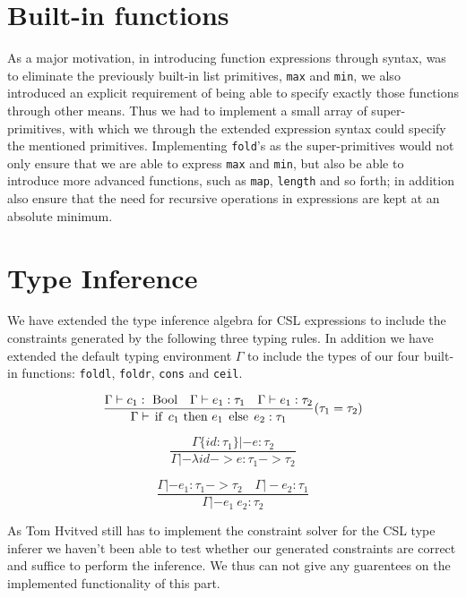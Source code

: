 \documentclass[10pt,a4paper,final,oneside,openany,article]{memoir}
\newcommand{\kw}[1]{\text{\lstinline{#1}}}
\begin{document}
\section{Built-in functions}
As a major motivation, in introducing function expressions through
syntax, was to eliminate the previously built-in list primitives,
\lstinline{max} and \lstinline{min}, we also introduced an explicit
requirement of being able to specify exactly those functions through
other means. Thus we had to implement a small array of super-primitives,
with which we through the extended expression syntax could specify the
mentioned primitives. Implementing \lstinline{fold}'s as the
super-primitives would not only ensure that we are able to express
\lstinline{max} and \lstinline{min}, but also be able to introduce more
advanced functions, such as \lstinline{map}, \lstinline{length} and so
forth; in addition also ensure that the need for recursive operations
in expressions are kept at an absolute minimum.

\section{Type Inference}
We have extended the type inference algebra for CSL expressions to
include the constraints generated by the following three typing rules.
In addition we have extended the default typing environment $\Gamma$
to include the types of our four built-in functions:
\lstinline{foldl}, \lstinline{foldr}, \lstinline{cons} and
\lstinline{ceil}.

\begin{equation*}
\frac{
  \Gamma |- c_1 : ~\kw{Bool}
  \quad \Gamma |- e_1 : \tau_1
  \quad \Gamma |- e_1 : \tau_2
}{
  \Gamma |- \kw{if}~ c_1 ~\kw{then}~ e_1 ~\kw{else}~ e_2 : \tau_1
}(\tau_1=\tau_2)\label{eq:type_cond}
\end{equation*}

\begin{equation*}
\frac{
  \Gamma\{id : \tau_1\} |- e : \tau_2
}{
  \Gamma |- \lambda id -> e : \tau_1 -> \tau_2
}\label{eq:type_lambda}
\end{equation*}

\begin{equation*}
\frac{
  \Gamma |- e_1 : \tau_1 -> \tau_2
  \quad \Gamma |- e_2 : \tau_1
}{
  \Gamma |- e_1~ e_2 : \tau_2
}\label{eq:type_apply}
\end{equation*}

As Tom Hvitved still has to implement the constraint solver for the
CSL type inferer we haven't been able to test whether our generated
constraints are correct and suffice to perform the inference. We thus
can not give any guarentees on the implemented functionality of this part.
\end{document}
